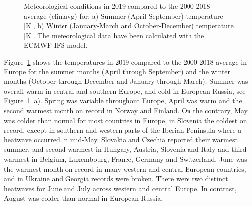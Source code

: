 \begin{figure}[h]
  \caption{Meteorological conditions in 2019 compared to the 2000-2018 average (climavg) for: a) Summer (April-September) temperature [K], b) Winter (January-March and October-December) temperature [K]. The meteorological data have been calculated with the ECMWF-IFS model.} 
\label{fig:temp-avMET}
\end{figure}

Figure~\ref{fig:temp-avMET} shows the temperatures in 2019 compared to the 2000-2018 average in Europe for the summer months (April through September) and the winter months (October through December and January through March). Summer was overall warm in central and southern Europe, and cold in European Russia, see Figure~\ref{fig:temp-avMET}~a). Spring was variable throughout Europe, April was warm and the second warmest month on record in Norway and Finland. On the contrary, May was colder than normal for most countries in Europe, in Slovenia the coldest on record, except in southern and western parts of the Iberian Peninsula where a heatwave occurred in mid-May. Slovakia and Czechia reported their warmest summer, and second warmest in Hungary, Austria, Slovenia and Italy and third warmest in Belgium, Luxembourg, France, Germany and Switzerland. June was the warmest month on record in many western and central European countries, and in Ukraine and Georgia records were broken. There were two distinct heatwaves for June and July across western and central Europe. In contrast, August was colder than normal in European Russia.


